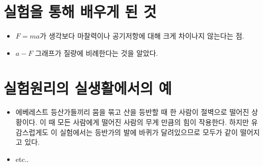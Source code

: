 \documentclass[12pt,a4paper]{article}
\begin{document}
\section{실험을 통해 배우게 된 것}
\begin{itemize}
    \item $F=ma$가 생각보다 마찰력이나 공기저항에 대해 크게 차이나지 않는다는 점.
    \item $a-F$ 그래프가 질량에 비례한다는 것을 알았다.
\end{itemize}
\section{실험원리의 실생활에서의 예}
\begin{itemize}
    \item 에베레스트 등산가들끼리 뭄을 묶고 산을 등반할 때 한 사람이 절벽으로 떨어진
        상황이다. 이 때 모든 사람에게 떨어진 사람의 무게 만큼의 힘이 작용한다. 하지만
        유감스럽게도 이 실험에서는 등반가의 발에 바퀴가 달려있으므로 모두가 같이
        떨어지고 있다.
    \item etc..
\end{itemize}
\end{document}
